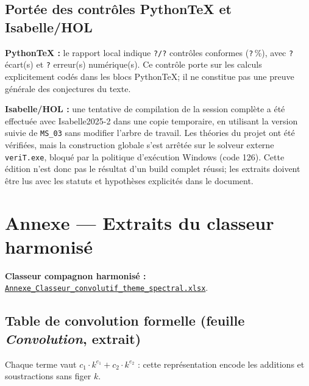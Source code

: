 \documentclass[11pt,a4paper]{article}
\newcommand{\vtotal}{?}\newcommand{\vconf}{?}\newcommand{\vtaux}{?}
\newcommand{\vecart}{?}\newcommand{\vnul}{?}\newcommand{\vnan}{?}
\begin{document}
\subsection{Portée des contrôles PythonTeX et Isabelle/HOL}
\begin{boitealerte}
\textbf{PythonTeX :} le rapport local indique
\texttt{\vconf/\vtotal} contrôles conformes (\texttt{\vtaux}\,\%),
avec \texttt{\vecart} écart(s) et \texttt{\vnan} erreur(s) numérique(s).
Ce contrôle porte sur les calculs explicitement codés dans les blocs
PythonTeX; il ne constitue pas une preuve générale des conjectures du texte.

\medskip
\textbf{Isabelle/HOL :} une tentative de compilation de la session complète
a été effectuée avec Isabelle2025-2 dans une copie temporaire, en utilisant
la version suivie de \texttt{MS\_03} sans modifier l'arbre de travail.
Les théories du projet ont été vérifiées, mais la construction globale s'est
arrêtée sur le solveur externe \texttt{veriT.exe}, bloqué par la politique
d'exécution Windows (code 126). Cette édition n'est donc pas le résultat d'un
build complet réussi; les extraits doivent être lus avec les statuts et
hypothèses explicités dans le document.
\end{boitealerte}

\section{Annexe --- Extraits du classeur harmonisé}
\textbf{Classeur compagnon harmonisé :}
\href{run:assets/Annexe_Classeur_convolutif_theme_spectral.xlsx}
{\texttt{Annexe\_Classeur\_convolutif\_theme\_spectral.xlsx}}.

\subsection{Table de convolution formelle (feuille \emph{Convolution}, extrait)}

Chaque terme vaut $c_1 \cdot k^{e_1} + c_2 \cdot k^{e_2}$ : cette
représentation encode les additions et soustractions sans figer $k$.
\end{document}
